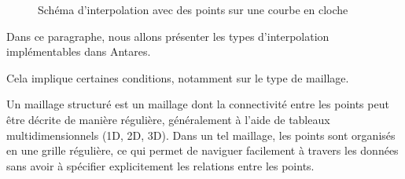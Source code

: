 \begin{figure}[ht!]
    \centering
    \caption{Schéma d'interpolation avec des points sur une courbe en cloche}
    \label{fig:interpolation_cloche_points}
\end{figure}

    
\vspace{0,5cm}

Dans ce paragraphe, nous allons présenter les types d'interpolation\cite{cassiopee2015} implémentables dans Antares.

Cela implique certaines conditions, notamment sur le type de maillage.

Un maillage structuré est un maillage dont la connectivité\label{connectivité} entre les points peut être décrite de manière régulière, généralement à l'aide de tableaux multidimensionnels (1D, 2D, 3D). Dans un tel maillage, les points sont organisés en une grille régulière, ce qui permet de naviguer facilement à travers les données sans avoir à spécifier explicitement les relations entre les points.

